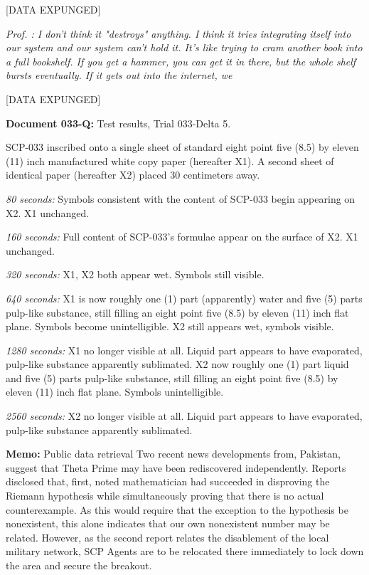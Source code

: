 [DATA EXPUNGED]

\textsl{Prof. : I don't think it "destroys" anything. I think it tries integrating itself into our system and our system can't hold it. It's like trying to cram another book into a full bookshelf. If you get a hammer, you can get it in there, but the whole shelf bursts eventually. If it gets out into the internet, we}

[DATA EXPUNGED]

\textbf{Document 033-Q:} Test results, Trial 033-Delta 5.

SCP-033 inscribed onto a single sheet of standard eight point five (8.5) by eleven (11) inch manufactured white copy paper (hereafter X1). A second sheet of identical paper (hereafter X2) placed 30 centimeters away.

\textsl{80 seconds:} Symbols consistent with the content of SCP-033 begin appearing on X2. X1 unchanged.

\textsl{160 seconds:} Full content of SCP-033's formulae appear on the surface of X2. X1 unchanged.

\textsl{320 seconds:} X1, X2 both appear wet. Symbols still visible.

\textsl{640 seconds:} X1 is now roughly one (1) part (apparently) water and five (5) parts pulp-like substance, still filling an eight point five (8.5) by eleven (11) inch flat plane. Symbols become unintelligible. X2 still appears wet, symbols visible.

\textsl{1280 seconds:} X1 no longer visible at all. Liquid part appears to have evaporated, pulp-like substance apparently sublimated. X2 now roughly one (1) part liquid and five (5) parts pulp-like substance, still filling an eight point five (8.5) by eleven (11) inch flat plane. Symbols unintelligible.

\textsl{2560 seconds:} X2 no longer visible at all. Liquid part appears to have evaporated, pulp-like substance apparently sublimated.

\textbf{Memo:} Public data retrieval
Two recent news developments from\linebreak {}, Pakistan, suggest that Theta Prime may have been rediscovered independently. Reports disclosed that, first, noted mathematician    had succeeded in disproving the Riemann hypothesis while simultaneously proving that there is no actual counterexample. As this would require that the exception to the hypothesis be nonexistent, this alone indicates that our own nonexistent number may be related. However, as the second report relates the disablement of the local military network, SCP Agents are to be relocated there immediately to lock down the area and secure the breakout.